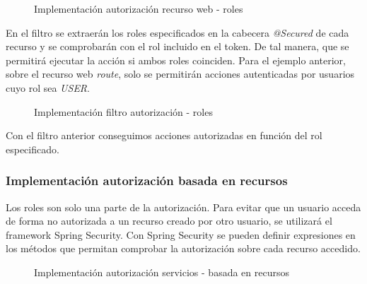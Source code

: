 \begin{figure}[H]
\centering
{}
\caption{Implementación autorización recurso web - roles}
\end{figure}


En el filtro se extraerán los roles especificados en la cabecera \textit{@Secured} de cada recurso y se comprobarán con el rol incluido en el token. De tal manera, que se permitirá ejecutar la acción si ambos roles coinciden. Para el ejemplo anterior, sobre el recurso web \textit{route}, solo se permitirán acciones autenticadas por usuarios cuyo rol sea \textit{USER}.


\begin{figure}[H]
\centering
{}
\caption{Implementación filtro autorización - roles}
\end{figure}

Con el filtro anterior conseguimos acciones autorizadas en función del rol especificado.


\subsubsection*{Implementación autorización basada en recursos}

Los roles son solo una parte de la autorización. Para evitar que un usuario acceda de forma no autorizada a un recurso creado por otro usuario, se utilizará el framework Spring Security. Con Spring Security se pueden definir expresiones en los métodos que permitan comprobar la autorización sobre cada recurso accedido.

\begin{figure}[H]
\centering
{}
\caption{Implementación autorización servicios - basada en recursos}
\end{figure}

